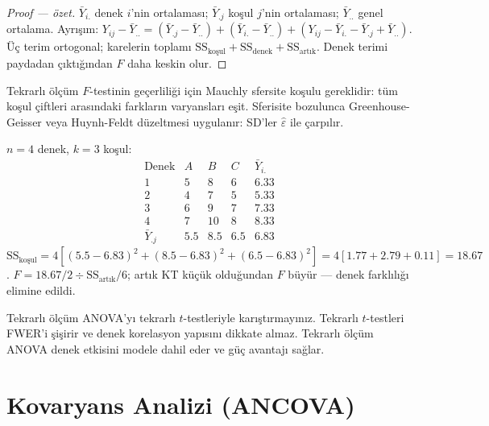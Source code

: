 \begin{proof}[Proof --- özet]
$\bar Y_{i.}$ denek $i$'nin ortalaması; $\bar Y_{.j}$ koşul $j$'nin ortalaması; $\bar Y_{..}$ genel ortalama. Ayrışım: $Y_{ij}-\bar Y_{..} = (\bar Y_{.j}-\bar Y_{..}) + (\bar Y_{i.}-\bar Y_{..}) + (Y_{ij}-\bar Y_{i.}-\bar Y_{.j}+\bar Y_{..})$. Üç terim ortogonal; karelerin toplamı $\mathrm{SS}_{\text{koşul}}+\mathrm{SS}_{\text{denek}}+\mathrm{SS}_{\text{artık}}$. Denek terimi paydadan çıktığından $F$ daha keskin olur.
\end{proof}

\begin{teorem}\label{thm:sferisite}
Tekrarlı ölçüm $F$-testinin geçerliliği için Mauchly sfersite koşulu gereklidir: tüm koşul çiftleri arasındaki farkların varyansları eşit. Sferisite bozulunca Greenhouse-Geisser veya Huynh-Feldt düzeltmesi uygulanır: SD'ler $\hat\varepsilon$ ile çarpılır.
\end{teorem}

\begin{ornek}
$n=4$ denek, $k=3$ koşul:
\[
\begin{array}{c|ccc|c}
\text{Denek} & A & B & C & \bar{Y}_{i.} \\ \hline
1 & 5 & 8 & 6 & 6.33 \\
2 & 4 & 7 & 5 & 5.33 \\
3 & 6 & 9 & 7 & 7.33 \\
4 & 7 & 10 & 8 & 8.33 \\ \hline
\bar{Y}_{.j} & 5.5 & 8.5 & 6.5 & 6.83
\end{array}
\]
$\mathrm{SS}_{\text{koşul}}=4[(5.5-6.83)^2+(8.5-6.83)^2+(6.5-6.83)^2]=4[1.77+2.79+0.11]=18.67$.
$F=18.67/2\div\mathrm{SS}_{\text{artık}}/6$; artık KT küçük olduğundan $F$ büyür --- denek farklılığı elimine edildi.
\end{ornek}

\begin{hataanalizi}
Tekrarlı ölçüm ANOVA'yı tekrarlı $t$-testleriyle karıştırmayınız. Tekrarlı $t$-testleri FWER'i şişirir ve denek korelasyon yapısını dikkate almaz. Tekrarlı ölçüm ANOVA denek etkisini modele dahil eder ve güç avantajı sağlar.
\end{hataanalizi}

\section{Kovaryans Analizi (ANCOVA)}
\label{sec:ancova}

